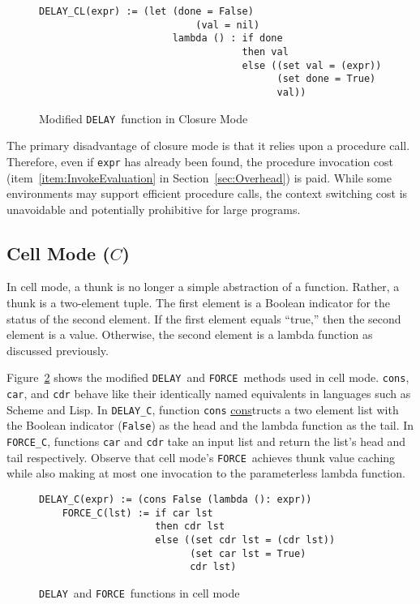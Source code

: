 \documentclass[11pt]{article}
\newcommand{\Delay}{\texttt{DELAY}}
\newcommand{\Force}{\texttt{FORCE}}
\begin{document}
\begin{figure}[ht]
  \begin{lstlisting}[]
    DELAY_CL(expr) := (let (done = False)
                           (val = nil)
                       lambda () : if done
                                   then val
                                   else ((set val = (expr))
                                         (set done = True)
                                         val))
  \end{lstlisting}
  \caption{Modified \Delay\ function in Closure Mode}
  \label{fig:impl:ClosureDelay}
\end{figure}

The primary disadvantage of closure mode is that it relies upon a procedure call.  Therefore, even if \texttt{expr} has already been found, the procedure invocation cost (item~\ref{item:InvokeEvaluation} in Section~\ref{sec:Overhead}) is paid.  While some environments may support efficient procedure calls, the context switching cost is unavoidable and potentially prohibitive for large programs.

\subsection{Cell Mode ($C$)}\label{sec:CellMode}

In cell mode, a thunk is no longer a simple abstraction of a function.  Rather, a thunk is a two-element tuple.  The first element is a Boolean indicator for the status of the second element.  If the first element equals ``true,'' then the second element is a value.  Otherwise, the second element is a lambda function as discussed previously.

Figure~\ref{fig:impl:CellForceDelay} shows the modified \Delay\ and \Force\ methods used in cell mode.  \texttt{cons}, \texttt{car}, and \texttt{cdr} behave like their identically named equivalents in languages such as Scheme and Lisp.  In \Delay\texttt{\_C}, function \texttt{cons} \underline{cons}tructs a two element list with the Boolean indicator (\texttt{False}) as the head and the lambda function as the tail.  In \Force\texttt{\_C}, functions \texttt{car} and \texttt{cdr} take an input list and return the list's head and tail respectively.  Observe that cell mode's \Force\ achieves thunk value caching while also making at most one invocation to the parameterless lambda function.

\begin{figure}[ht]
  \begin{lstlisting}[]
    DELAY_C(expr) := (cons False (lambda (): expr))
    FORCE_C(lst) := if car lst
                    then cdr lst
                    else ((set cdr lst = (cdr lst))
                          (set car lst = True)
                          cdr lst)
  \end{lstlisting}
  \caption{\Delay\ and \Force\ functions in cell mode}
  \label{fig:impl:CellForceDelay}
\end{figure}
\end{document}
